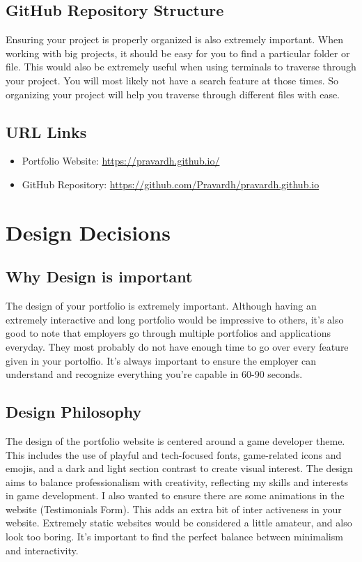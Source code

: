 \documentclass[15pt]{report}
\begin{document}
\section{GitHub Repository Structure}

Ensuring your project is properly organized is also extremely important. When working with big projects, it should be easy for you to find a particular folder or file. This would also be extremely useful when using terminals to traverse through your project. You will most likely not have a search feature at those times. So organizing your project will help you traverse through different files with ease. 

\section{URL Links}
\begin{itemize}

    \item Portfolio Website: \href{https://pravardh.github.io/}{https://pravardh.github.io/}

    
    \item GitHub Repository: \href{https://github.com/Pravardh/pravardh.github.io}{https://github.com/Pravardh/pravardh.github.io}

\end{itemize}

\chapter{Design Decisions}

\section{Why Design is important}

The design of your portfolio is extremely important. Although having an extremely interactive and long portfolio would be impressive to others, it's also good to note that employers go through multiple portfolios and applications everyday. They most probably do not have enough time to go over every feature given in your portolfio. It's always important to ensure the employer can understand and recognize everything you're capable in 60-90 seconds. 

\section{Design Philosophy}
The design of the portfolio website is centered around a game developer theme. This includes the use of playful and tech-focused fonts, game-related icons and emojis, and a dark and light section contrast to create visual interest. The design aims to balance professionalism with creativity, reflecting my skills and interests in game development. I also wanted to ensure there are some animations in the website (Testimonials Form). This adds an extra bit of inter activeness in your website. Extremely static websites would be considered a little amateur, and also look too boring. It's important to find the perfect balance between minimalism and interactivity. 
\end{document}
